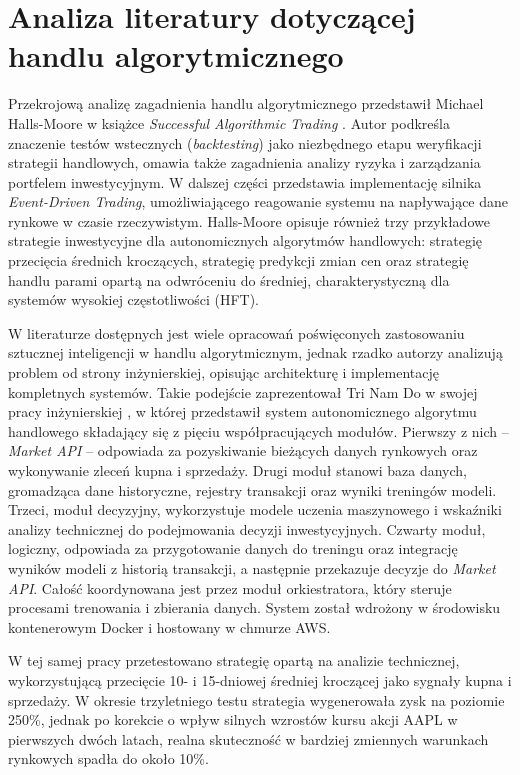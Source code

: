 \chapter{Analiza literatury dotyczącej handlu algorytmicznego}

Przekrojową analizę zagadnienia handlu algorytmicznego przedstawił Michael Halls-Moore w książce \textit{Successful Algorithmic Trading} \parencite{halls2015}. Autor podkreśla znaczenie testów wstecznych (\emph{backtesting}) jako niezbędnego etapu weryfikacji strategii handlowych, omawia także zagadnienia analizy ryzyka i zarządzania portfelem inwestycyjnym. W dalszej części przedstawia implementację silnika \emph{Event-Driven Trading}, umożliwiającego reagowanie systemu na napływające dane rynkowe w czasie rzeczywistym. Halls-Moore opisuje również trzy przykładowe strategie inwestycyjne dla autonomicznych algorytmów handlowych: strategię przecięcia średnich kroczących, strategię predykcji zmian cen oraz strategię handlu parami opartą na odwróceniu do średniej, charakterystyczną dla systemów wysokiej częstotliwości (HFT).

W literaturze dostępnych jest wiele opracowań poświęconych zastosowaniu sztucznej inteligencji w handlu algorytmicznym, jednak rzadko autorzy analizują problem od strony inżynierskiej, opisując architekturę i implementację kompletnych systemów. Takie podejście zaprezentował Tri Nam Do w swojej pracy inżynierskiej \parencite{do2021}, w której przedstawił system autonomicznego algorytmu handlowego składający się z pięciu współpracujących modułów. Pierwszy z nich – \emph{Market API} – odpowiada za pozyskiwanie bieżących danych rynkowych oraz wykonywanie zleceń kupna i sprzedaży. Drugi moduł stanowi baza danych, gromadząca dane historyczne, rejestry transakcji oraz wyniki treningów modeli. Trzeci, moduł decyzyjny, wykorzystuje modele uczenia maszynowego i wskaźniki analizy technicznej do podejmowania decyzji inwestycyjnych. Czwarty moduł, logiczny, odpowiada za przygotowanie danych do treningu oraz integrację wyników modeli z historią transakcji, a następnie przekazuje decyzje do \emph{Market API}. Całość koordynowana jest przez moduł orkiestratora, który steruje procesami trenowania i zbierania danych. System został wdrożony w środowisku kontenerowym Docker i hostowany w chmurze AWS.

W tej samej pracy przetestowano strategię opartą na analizie technicznej, wykorzystującą przecięcie 10- i 15-dniowej średniej kroczącej jako sygnały kupna i sprzedaży. W okresie trzyletniego testu strategia wygenerowała zysk na poziomie 250\%, jednak po korekcie o wpływ silnych wzrostów kursu akcji AAPL w pierwszych dwóch latach, realna skuteczność w bardziej zmiennych warunkach rynkowych spadła do około 10\%.

